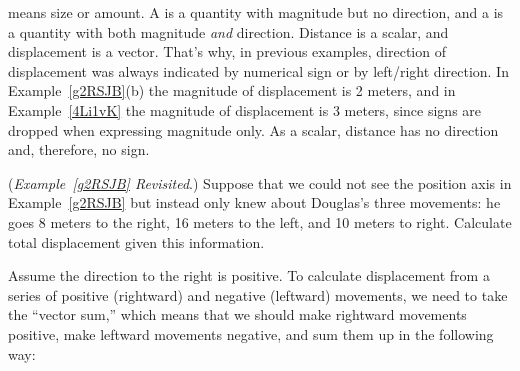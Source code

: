 \documentclass{article}
\begin{document}
 means size or amount. A  is a quantity with magnitude but no direction, and a  is a quantity with both magnitude \textit{and} direction. Distance is a scalar, and displacement is a vector. That's why, in previous examples, direction of displacement was always indicated by numerical sign or by left/right direction. In Example~\ref{g2RSJB}(b) the magnitude of displacement is 2 meters, and in Example~\ref{4Li1vK} the magnitude of displacement is 3 meters, since signs are dropped when expressing magnitude only. As a scalar, distance has no direction and, therefore, no sign.

\vspace{1em}

\begin{example} \label{LBLwIS}
    (\textit{Example~\ref{g2RSJB} Revisited}.) Suppose that we could not see the position axis in Example~\ref{g2RSJB} but instead only knew about Douglas's three movements: he goes 8 meters to the right, 16 meters to the left, and 10 meters to right. Calculate total displacement given this information.
\end{example}

\begin{center}
\end{center}

 Assume the direction to the right is positive. To calculate displacement from a series of positive (rightward) and negative (leftward) movements, we need to take the ``vector sum,'' which means that we should make rightward movements positive, make leftward movements negative, and sum them up in the following way:
\end{document}
